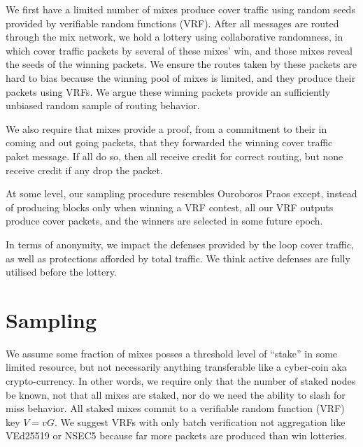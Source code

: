 ﻿\documentclass{sig-alternate-hotpets}
\begin{document}
We first have a limited number of mixes produce cover traffic using random seeds provided by verifiable random functions (VRF). 
After all messages are routed through the mix network, we hold a lottery using collaborative randomness, in which cover traffic packets by several of these mixes’ win, and those mixes reveal the seeds of the winning packets. 
We ensure the routes taken by these packets are hard to bias because the winning pool of mixes is limited, and they produce their packets using VRFs.  
We argue these winning packets provide an sufficiently unbiased random sample of routing behavior.

We also require that mixes provide a proof, from a commitment to their in coming and out going packets, that they forwarded the winning cover traffic paket message.  
If all do so, then all receive credit for correct routing, but none receive credit if any drop the packet.

At some level, our sampling procedure resembles Ouroboros Praos \cite{OuroborosPraos} except, instead of producing blocks only when winning a VRF contest, all our VRF outputs produce cover packets, and the winners are selected in some future epoch.  

In terms of anonymity, we impact the defenses provided by the loop cover traffic, as well as protections afforded by total traffic.  We think active defenses are fully utilised before the lottery.  

\section{Sampling} %

We assume some fraction of mixes posses a threshold level of ``stake'' in some limited resource,
 but not necessarily anything transferable like a cyber-coin aka crypto-currency.  In other words, we require only that the number of staked nodes be known, not that all mixes are staked, nor do we need the ability to slash for miss behavior.  
All staked mixes commit to a verifiable random function (VRF) key $V = v G$.  We suggest VRFs with only batch verification not aggregation like VEd25519 or NSEC5 because far more packets are produced than win lotteries. 
\end{document}
